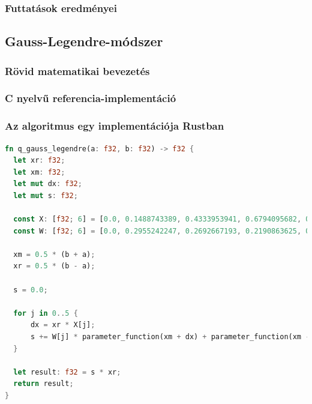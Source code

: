 \subsubsection{Futtatások eredményei} %

\subsection{Gauss-Legendre-módszer}
\subsubsection{Rövid matematikai bevezetés}
\subsubsection{C nyelvű referencia-implementáció}
\subsubsection{Az algoritmus egy implementációja Rustban}
\begin{lstlisting}[language=Rust]
fn q_gauss_legendre(a: f32, b: f32) -> f32 {
  let xr: f32;
  let xm: f32;
  let mut dx: f32;
  let mut s: f32;
  
  const X: [f32; 6] = [0.0, 0.1488743389, 0.4333953941, 0.6794095682, 0.8650633666,0.9739065285];
  const W: [f32; 6] = [0.0, 0.2955242247, 0.2692667193, 0.2190863625, 0.1494513491, 0.0666713443];
  
  xm = 0.5 * (b + a);
  xr = 0.5 * (b - a);
  
  s = 0.0;
  
  for j in 0..5 {
	  dx = xr * X[j];
	  s += W[j] * parameter_function(xm + dx) + parameter_function(xm - dx);
  }
  
  let result: f32 = s * xr;
  return result;
}  
\end{lstlisting}

